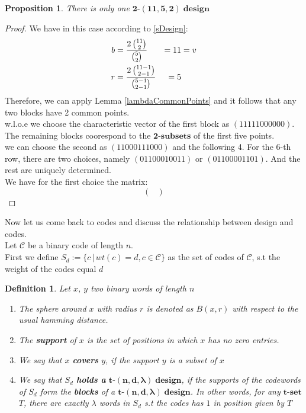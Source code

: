 \documentclass{article}
\newtheorem{definition}[theorem]{Definition}
\newtheorem{prop}[theorem]{Proposition}
\numberwithin{equation}{theorem}
\newcommand{\tParamDesign}[4]{\ensuremath{\bm{#1\mbox{-}(#2,#3,#4)\; design}}}
\newcommand{\pluralMyBlock}{\textbf{blocks}}
\newcommand{\cCodes}{\ensuremath{\mathscr{C}}}
\newcommand{\tSet}[1]{\ensuremath{\bm{#1\mbox{-}{set}}}}
\newcommand{\tSubset}[1]{\ensuremath{\bm{#1\mbox{-}{subset}}}}
\newcommand{\wloe}{w.l.o.e}
\begin{document}
\begin{prop}
There is only one \tParamDesign{2}{11}{5}{2}
\end{prop}
\begin{proof}
We have in this case according to \eqref{sDesign}:
\begin{alignat}{3}
	b &= \frac{2\,\binom{11}{2}}{\binom{5}{2}} & = 11 &= v \notag\\
	r &= \frac{2 \, \binom{11-1}{2 - 1}}{\binom{5-1}{2 - 1}} & = 5 & \notag\phantom{v} 
\end{alignat}
Therefore, we can apply Lemma \ref{lambdaCommonPoints} and it follows that any two blocks have 2 common points.\\
{\wloe} we choose the characteristic vector of the first block as 
$(1 1 1 1 1 0 0 0 0 0 0)$. The remaining blocks coorespond to the {\tSubset{2}}\textbf{s} of the first five points.\\
we can choose the second as $(1 1 0 0 0 1 1 1 0 0 0)$ and the following 4. For the $6$-th row, there are two choices, namely
$(0 1 1 0 0 0 1 0 0 1 1)$ or $(0 1 1 0 0 0 0 1 1 0 1)$. And the rest are uniquely determined. \\
We have for the first choice the matrix:
\[
	\begin{pmatrix}
			
	\end{pmatrix}
\]
\end{proof}
Now let us come back to codes and discuss the relationship between design and codes.\\
Let {\cCodes} be a binary code of length $n$.\\
First we define $S_d := \{c\,|\,wt(c) = d, c \in \cCodes\}$ as the set of codes of \cCodes, s.t the weight of the codes equal $d$

\begin{definition}
	Let $x$, $y$ two binary words of length $n$
	\begin{enumerate}
		\item The sphere around $x$ with radius $r$ is denoted as $B(x,r)$ with respect to the usual hamming distance.
		\item The \textbf{support} of $x$ is the set of positions in which $x$ has no zero entries.
		\item We say that $x$ \textbf{covers} $y$, if the support $y$ is a subset of $x$
		\item We say that $S_d$ \textbf{holds a } {\tParamDesign{t}{n}{d}{\lambda}}, if the supports of the codewords of $S_d$ form the {\pluralMyBlock} of a {\tParamDesign{t}{n}{d}{\lambda}}. In other words, for any {\tSet{t}} $T$, there are exactly $\lambda$ words in $S_d$ s.t the codes has $1$ in position given by $T$
	\end{enumerate}
\end{definition}
\end{document}
